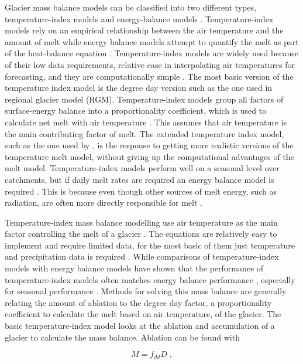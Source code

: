 \documentclass{article}
\begin{document}
Glacier mass balance models can be classified into two different types, temperature-index models and energy-balance models \citep{Hock2005}. Temperature-index models rely on an empirical relationship between the air temperature and the amount of melt while energy balance models attempt to quantify the melt as part of the heat-balance equation \citep{Hock2003}. Temperature-index models are widely used because of their low data requirements, relative ease in interpolating air temperatures for forecasting, and they are computationally simple \citep{Hock2003}. The most basic version of the temperature index model is the degree day version such as the one used in \citet{Clarke2015} regional glacier model (RGM). Temperature-index models group all factors of surface-energy balance into a proportionality coefficient, which is used to calculate net melt with air temperature \citep{Pradhananga2020}. This assumes that air temperature is the main contributing factor of melt. The extended temperature index model, such as the one used by \citet{Marzeion2012}, is the response to getting more realistic versions of the temperature melt model, without giving up the computational advantages of the melt model. Temperature-index models perform well on a seasonal level over catchments, but if daily melt rates are required an energy balance model is required \citep{Gudmundsson2009, Hock2003}. This is because even though other sources of melt energy, such as radiation, are often more directly responsible for melt \citep{Pradhananga2020}. 


Temperature-index mass balance modelling use air temperature as the main factor controlling the melt of a glacier \citep{Pradhananga2020}. The equations are relatively easy to implement and require limited data, for the most basic of them just temperature and precipitation data is required \citep{Clarke2015}. While comparisons of temperature-index models with energy balance models have shown that the performance of temperature-index models often matches energy balance performance \citep{Hock2005}, especially for seasonal performance \citep{Gudmundsson2009}. Methods for solving this mass balance are generally relating the amount of ablation to the degree day factor, a proportionality coefficient to calculate the melt based on air temperature, of the glacier\citep{Pradhananga2020}. The basic temperature-index model looks at the ablation and accumulation of a glacier to calculate the mass balance. Ablation can be found with

\begin{equation} \label{Melt}
M = f_{dd}D \; ,
\end{equation}
\end{document}
